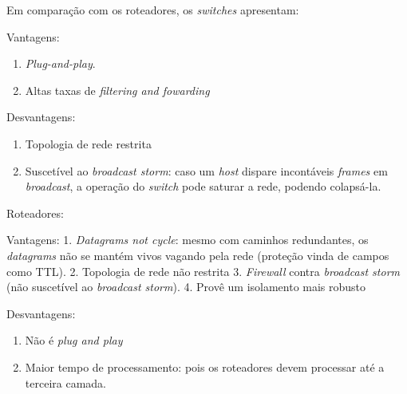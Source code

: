Em comparação com os roteadores, os \emph{switches} apresentam:

Vantagens:

\begin{enumerate}
\def\labelenumi{\arabic{enumi}.}
\tightlist
\item
  \emph{Plug-and-play}.
\item
  Altas taxas de \emph{filtering and fowarding}
\end{enumerate}

Desvantagens:

\begin{enumerate}
\def\labelenumi{\arabic{enumi}.}
\tightlist
\item
  Topologia de rede restrita
\item
  Suscetível ao \emph{broadcast storm}: caso um \emph{host} dispare
  incontáveis \emph{frames} em \emph{broadcast}, a operação do
  \emph{switch} pode saturar a rede, podendo colapsá-la.
\end{enumerate}

Roteadores:

Vantagens: 1. \emph{Datagrams not cycle}: mesmo com caminhos
redundantes, os \emph{datagrams} não se mantém vivos vagando pela rede
(proteção vinda de campos como TTL). 2. Topologia de rede não restrita
3. \emph{Firewall} contra \emph{broadcast storm} (não suscetível ao
\emph{broadcast storm}). 4. Provê um isolamento mais robusto

Desvantagens:

\begin{enumerate}
\def\labelenumi{\arabic{enumi}.}
\tightlist
\item
  Não é \emph{plug and play}
\item
  Maior tempo de processamento: pois os roteadores devem processar até a
  terceira camada.
\end{enumerate}